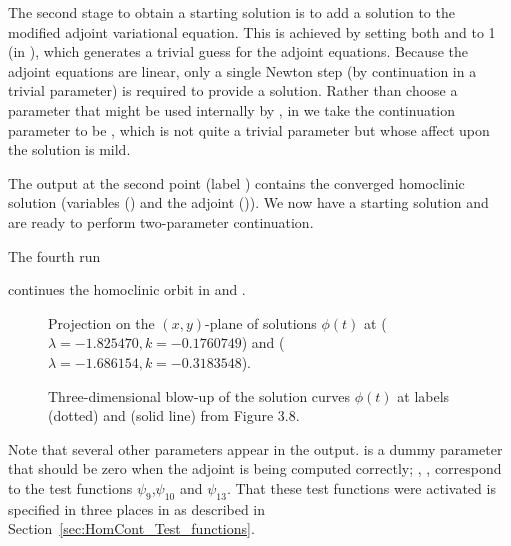 \documentclass[12pt]{report}
\begin{document}
The second stage to obtain a starting solution 
is to add a solution to the modified adjoint
variational equation. This is achieved by setting both 
 and  to 1 (in ), which generates
a trivial guess for the adjoint equations. Because the adjoint
equations are linear, only a single
Newton step (by continuation in a trivial parameter) 
is required to provide a solution.
Rather than choose a parameter that might be used internally
by \AUTO, in  we take the continuation parameter
to be , which is not quite a trivial parameter
but whose affect upon the solution is mild.
\begin{center}
\end{center}
The output at the second point (label ) 
contains the converged homoclinic
solution (variables () and the adjoint ()). We now have a starting solution 
and are ready to perform two-parameter continuation.

The fourth run
\begin{center}
\end{center}
continues the homoclinic orbit in  and . 
%
\begin{figure}[p]
\epsfysize 9.0cm
\centerline{}
\caption{Projection on the $(x,y)$-plane of solutions $\phi(t)$
at  ($\lambda=-1.825470, k=-0.1760749$) and
 ($\lambda=-1.686154, k=-0.3183548$).}
\label{kf.2a}
\end{figure}
\begin{figure}[p]
\epsfysize 8.0cm
\centerline{}
\caption{Three-dimensional blow-up of the solution curves
 $\phi(t)$ 
at labels  (dotted) and  (solid line) from Figure 3.8.}
\label{kf.2b}
\end{figure}
%
Note that several other parameters appear in
the output.  is a dummy parameter
that should be zero when the adjoint is being computed correctly;
, ,  correspond to the
test functions $\psi_9$,$\psi_{10}$ and $\psi_{13}$. 
That these test functions were activated is specified
in three places in  
as described in Section~\ref{sec:HomCont_Test_functions}.  
\end{document}
